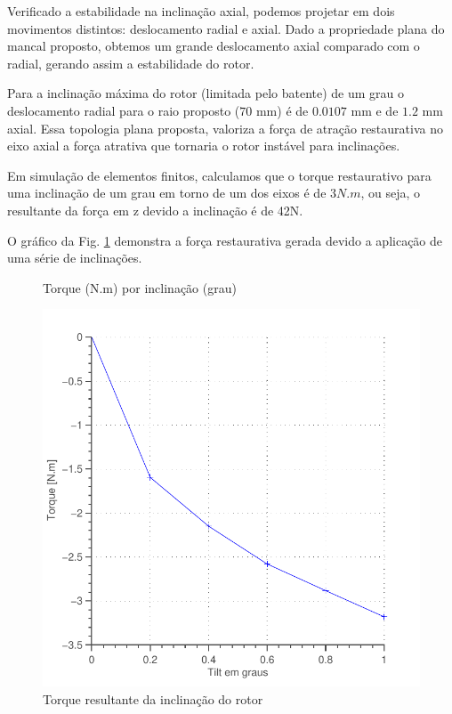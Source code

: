 Verificado a estabilidade na inclinação axial, podemos projetar  em dois movimentos distintos: deslocamento radial e axial. Dado a propriedade plana do mancal proposto, obtemos um grande deslocamento axial comparado com o radial, gerando assim a estabilidade do rotor.

Para a inclinação máxima do rotor (limitada pelo batente) de um grau o deslocamento radial para o raio proposto ($70$ mm) é de $0.0107$ mm e de $1.2$ mm axial. Essa topologia plana proposta, valoriza a força de atração restaurativa no eixo axial a força atrativa que tornaria o rotor instável para inclinações.

Em simulação de elementos finitos, calculamos que o torque restaurativo para uma inclinação de um grau em torno de um dos eixos é de $3 N.m$, ou seja, o resultante da força em z devido a inclinação é de 42N.

O gráfico da Fig. \ref{fig:passivo:torque:tilt} demonstra a força restaurativa gerada devido a aplicação de uma série de inclinações.

\begin{figure}[!ht]
\centering
\caption*{Torque (N.m) por inclinação (grau) }
\includegraphics[width=0.7\linewidth]{Figs/Simulacoes/Passivo2/fem/passivo_otimizado_fem_tilt}
\caption{Torque resultante da inclinação do rotor}
\label{fig:passivo:torque:tilt} 
\end{figure}
